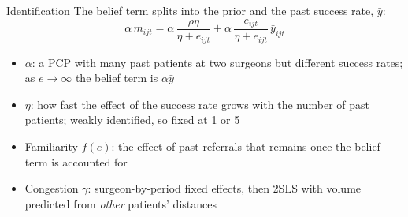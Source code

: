 \documentclass[aspectratio=169,11pt]{beamer}
\begin{document}
\begin{frame}
\end{frame}

\begin{frame}{Identification}
  The belief term splits into the prior and the past success rate, $\bar y$:
  $$\alpha\, m_{ijt} = \alpha\,\frac{\rho\eta}{\eta + e_{ijt}} + \alpha\,\frac{e_{ijt}}{\eta + e_{ijt}}\,\bar y_{ijt}$$
  \begin{itemize}\setlength{\itemsep}{7pt}
    \item $\alpha$: a PCP with many past patients at two surgeons but different success rates; as $e \to \infty$ the belief term is $\alpha \bar y$
    \item $\eta$: how fast the effect of the success rate grows with the number of past patients; weakly identified, so fixed at 1 or 5
    \item Familiarity $f(e)$: the effect of past referrals that remains once the belief term is accounted for
    \item Congestion $\gamma$: surgeon-by-period fixed effects, then 2SLS with volume predicted from \emph{other} patients' distances
  \end{itemize}
\end{frame}
\end{document}
